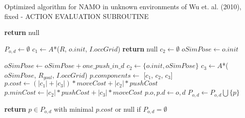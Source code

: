 \begin{algorithm}[H]

  \caption{Optimized algorithm for NAMO in unknown environments of Wu et. al. (2010), fixed - ACTION EVALUATION SUBROUTINE}

  \label{alg:01-wu-optevaluateaction}

  \begin{algorithmic}[1]


        \State \textbf{return} null
      \EndIf

      \State $P_{o,d} \gets \emptyset$
      \State $c_{1} \gets A$*($R$, $o.init$, $I.occGrid$) 
       
        \State \textbf{return} null
      \EndIf
      \State $c_{2} \gets \emptyset$
      \State $oSimPose \gets o.init$

       
        \State $oSimPose \gets oSimPose + one\_push\_in\_d$ 
         
          \State $c_{2} \gets \{o.init, oSimPose\}$ 
          \State $c_{3} \gets A$*($oSimPose$, $R_{goal}$, $I.occGrid$)
           
            \State $p.components \gets$ [$c_{1}$, $c_{2}$, $c_{3}$]
            \State $p.cost \gets (|c_{1}| + |c_{3}|) * moveCost + |c_{2}| * pushCost$
            \State $p.minCost \gets |c_{2}| * pushCost + |c_{3}| * moveCost$
            \State $p.o, p.d \gets o, d$
            \State $P_{o,d} \gets P_{o,d} \bigcup \{p\}$
          \EndIf
        \EndIf
      \EndWhile

      \State \textbf{return} $p \in P_{o,d}$ with minimal $p.cost$ or null if $P_{o,d} = \emptyset$

    \EndProcedure

  \end{algorithmic}

\end{algorithm}
